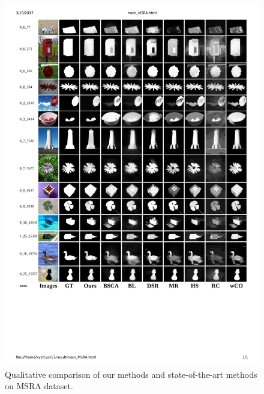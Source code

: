 \documentclass[journal]{IEEEtran}
\begin{document}
\begin{figure}[t]
\begin{center}
\includegraphics[width=\linewidth]{cmp_msra.pdf}
\end{center}
\vspace{-10pt}
\caption{Qualitative comparison of our methods and state-of-the-art methods on MSRA dataset.}
\label{cmp_msra}
\end{figure}

\end{document}

